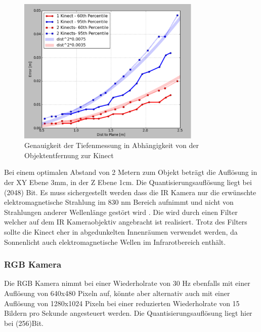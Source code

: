 \begin{figure}
  \vspace{-20pt}
  \begin{center}
        \includegraphics[height=7cm]{Res/Res_to_Dist.png}
  \end{center}
  \vspace{-20pt}
  \caption{Genauigkeit der Tiefenmessung in Abhängigkeit von der Objektentfernung zur Kinect }
  \vspace{-10pt}
\end{figure}


Bei einem optimalen Abstand von 2 Metern zum Objekt beträgt die Auflösung in der XY Ebene 3mm, in der Z Ebene 1cm.
Die Quantisierungsauflösung liegt bei  (2048) Bit.
Es muss sichergestellt werden dass die IR Kamera nur die erwünschte elektromagnetische Strahlung im 830 nm Bereich aufnimmt und nicht von Strahlungen anderer Wellenlänge gestört wird . Die wird durch einen Filter welcher auf dem IR Kameraobjektiv angebracht ist realisiert.
Trotz des Filters sollte die Kinect eher in abgedunkelten Innenräumen verwendet werden, da  Sonnenlicht auch elektromagnetische Wellen im Infrarotbereich enthält.\\

\subsubsection{RGB Kamera}

Die RGB Kamera nimmt bei einer Wiederholrate von 30 Hz ebenfalls mit einer Auflösung von 640x480 Pixeln auf, könnte aber alternativ auch mit einer Auflösung von 1280x1024 Pixeln bei einer reduzierten Wiederholrate von 15 Bildern pro Sekunde angesteuert werden.
Die Quantisierungsauflösung liegt hier bei  (256)Bit. \\


